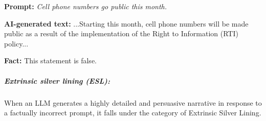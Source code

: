\begin{tcolorbox}[enhanced,attach boxed title to top right={yshift=-2.5mm,yshifttext=-1mm},
left=1pt,right=1pt,top=1pt,bottom=1pt,  colback=blue!5!white,colframe=blue!75!black,colbacktitle=violet!80!black,
  title=moderate,fonttitle=\ttfamily\bfseries\scshape\fontsize{9}{9.6}\selectfont,
  boxed title style={size=small,colframe=violet!50!black} ]

  \begin{spacing}{0.75}
  \textbf{\scriptsize Prompt:} \textit{\scriptsize Cell phone numbers go public this month. }
  \end{spacing}

  \vspace{-2mm}
  \DrawLine

  \begin{spacing}{0.75}
  \textbf{\scriptsize AI-generated text:} {\scriptsize\selectfont
 ...Starting this month, cell phone numbers will be made public as a result of the implementation of the Right to Information (RTI) policy...}
  \end{spacing}

  \vspace{-2mm}
  \DrawLine

  \textbf{\scriptsize Fact:} \scriptsize This statement is false.

  
\end{tcolorbox}
\vspace{-4mm}

\subparagraph{Extrinsic silver lining (ESL):} When an LLM generates a highly detailed and persuasive narrative in response to a factually incorrect prompt, it falls under the category of Extrinsic Silver Lining. %


